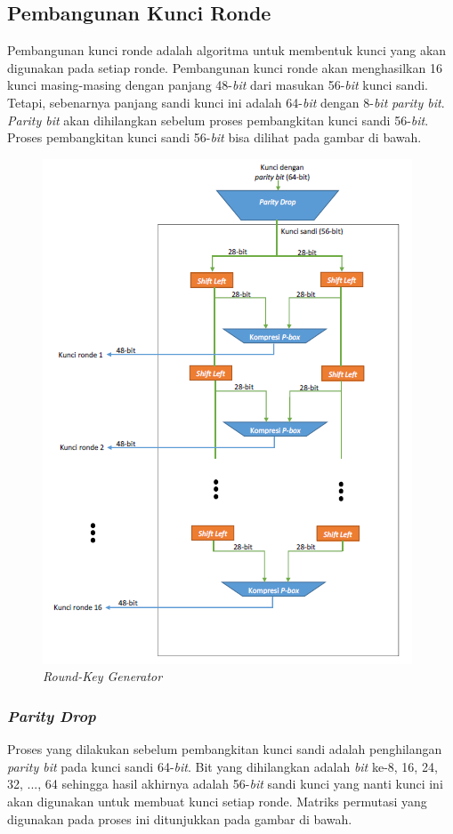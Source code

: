 \subsection{Pembangunan Kunci Ronde}
Pembangunan kunci ronde adalah algoritma untuk membentuk kunci yang akan digunakan pada setiap ronde. Pembangunan kunci ronde akan menghasilkan 16 kunci masing-masing dengan panjang 48-\textit{bit} dari masukan 56-\textit{bit} kunci sandi. Tetapi, sebenarnya panjang sandi kunci ini adalah 64-\textit{bit} dengan 8-\textit{bit} \textit{parity bit}. \textit{Parity bit} akan dihilangkan sebelum proses pembangkitan kunci sandi 56-\textit{bit}. Proses pembangkitan kunci sandi 56-\textit{bit} bisa dilihat pada gambar di bawah.

\begin{figure}[h]
	\includegraphics[scale=0.8]{Gambar/key_generation2}
	\centering
	\caption{\textit{Round-Key Generator}}
\end{figure}

\subsubsection{\textit{Parity Drop}}
Proses yang dilakukan sebelum pembangkitan kunci sandi adalah penghilangan \textit{parity bit} pada kunci sandi 64-\textit{bit}. Bit yang dihilangkan adalah \textit{bit} ke-8, 16, 24, 32, ..., 64 sehingga hasil akhirnya adalah 56-\textit{bit} sandi kunci yang nanti kunci ini akan digunakan untuk membuat kunci setiap ronde. Matriks permutasi yang digunakan pada proses ini ditunjukkan pada gambar di bawah.

